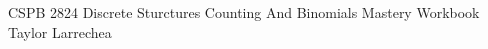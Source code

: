 \documentclass{Classes/solutionclass}
\begin{document}
\pretitle
{CSPB 2824}
{\normalsize{Discrete Sturctures}}
{\normalsize{Counting And Binomials Mastery Workbook}}
{Taylor Larrechea}
\makeatletter
    \startcontents[sections]
    \thispagestyle{fancy}
\makeatother
\vspace{-2em}

\end{document}
